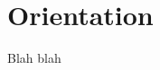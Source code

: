 \documentclass[../main.tex]{subfiles}
\begin{document}
\section{Orientation}
 
Blah blah
\end{document}
